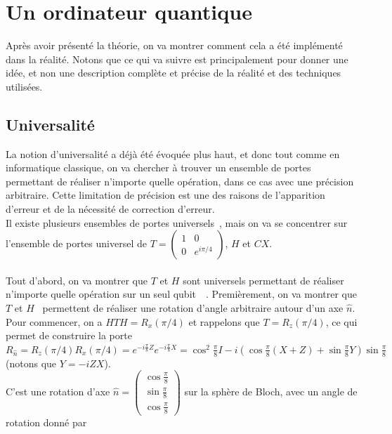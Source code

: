 \chapter{Un ordinateur quantique}\label{ch:un-ordinateur-quantique}

Après avoir présenté la théorie, on va montrer comment cela a été implémenté
dans la réalité.
Notons que ce qui va suivre est principalement pour donner une idée, et non une
description complète et précise de la réalité et des techniques utilisées.

\section{Universalité}\label{sec:universalite}

La notion d'universalité a déjà été évoquée plus haut, et donc tout comme en
informatique classique, on va chercher à trouver un ensemble de portes permettant
de réaliser n'importe quelle opération, dans ce cas avec une précision arbitraire.
Cette limitation de précision est une des raisons de l'apparition d'erreur et de la
nécessité de correction d'erreur.\\
Il existe plusieurs ensembles de portes universels~\cite{universality-proof}, mais on va se concentrer sur
l'ensemble de portes universel de $T = \begin{pmatrix} 1 & 0 \\ 0 & e^{i\pi/4}
\end{pmatrix}$, $H$ et $CX$.\\ \\
Tout d'abord, on va montrer que $T$ et $H$ sont universels permettant de réaliser
n'importe quelle opération sur un seul qubit~\cite{univ-sing,budinger2022alloptical}~.
Premièrement, on va montrer que $T$ et $H$~\cite{hadamard-imp} permettent de réaliser une rotation
d'angle arbitraire autour d'un axe $\hat{n}$.\\
Pour commencer, on a $HTH = R_x(\pi/4)$ et rappelons que $T = R_z(\pi/4)$, ce qui
permet de construire la porte $R_{\hat{n}} = R_z(\pi/4) R_x(\pi/4) = e^{-i\frac{\pi}{8}Z}
e^{-i\frac{\pi}{8}X} = \cos^2 \frac{\pi}{8} I - i \left( \cos \frac{\pi}{8} (X+Z) + \sin
\frac{\pi}{8} Y\right) \sin \frac{\pi}{8}$ (notons que $Y = -i Z X$).\\
C'est une rotation d'axe $\hat{n} = \begin{pmatrix}
\cos \frac{\pi}{8} \\
\sin \frac{\pi}{8} \\
\cos \frac{\pi}{8}
\end{pmatrix}$ sur la sphère de Bloch, avec un angle de rotation donné par
